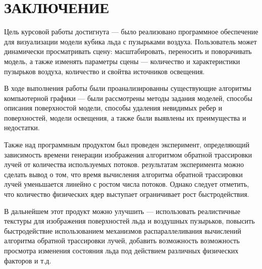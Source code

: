 \chapter*{ЗАКЛЮЧЕНИЕ}

Цель курсовой работы достигнута --- было реализовано программное обеспечение для визуализации модели кубика льда с пузырьками воздуха. Пользователь может динамически просматривать сцену: масштабировать, переносить и поворачивать модель, а также изменять параметры сцены --- количество и характеристики пузырьков воздуха, количество и свойтва источников освещения.

В ходе выполнения работы были проанализированны существующие алгоритмы компьютерной графики --- были рассмотрены методы задания моделей, способы описания поверхностой модели, способы удаления невидимых ребер и поверхностей, модели освещения, а также были выявлены их преимущества и недостатки.

Также над программным продуктом был проведен эксперимент, определяющий зависимость времени генерации изображения алгоритмом обратной трассировки лучей от количества используемых потоков. результатам эксперимента можно сделать вывод о том, что время вычисления алгоритма обратной трассировки лучей уменьшается линейно с ростом числа потоков. Однако следует отметить, что количество физических ядер выступает ограничивает рост быстродействия.

В дальнейшем этот продукт можно улучшить --- использовать реалистичные текстуры для изображения поверхностей льда и воздушных пузырьков, повысить быстродействие использованием механизмов распараллеливания вычислений алгоритма обратной трассировки лучей, добавить возможность возможность просмотра изменения состояния льда под действием различных физических факторов и т.д.


